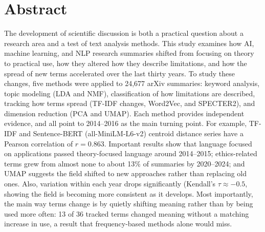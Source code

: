 \section{Abstract}
The development of scientific discussion is both a practical question about a research area and a test of text analysis methods. This study examines how AI, machine learning, and NLP research summaries shifted from focusing on theory to practical use, how they altered how they describe limitations, and how the spread of new terms accelerated over the last thirty years. To study these changes, five methods were applied to 24,677 arXiv summaries: keyword analysis, topic modeling (LDA and NMF), classification of how limitations are described, tracking how terms spread (TF-IDF changes, Word2Vec, and SPECTER2), and dimension reduction (PCA and UMAP). Each method provides independent evidence, and all point to 2014–2016 as the main turning point. For example, TF-IDF and Sentence-BERT (all-MiniLM-L6-v2) centroid distance series have a Pearson correlation of $r = 0.863$. Important results show that language focused on applications passed theory-focused language around 2014–2015; ethics-related terms grew from almost none to about 13\% of summaries by 2020–2024; and UMAP suggests the field shifted to new approaches rather than replacing old ones. Also, variation within each year drops significantly (Kendall’s $\tau \approx -0.5$, showing the field is becoming more consistent as it develops. Most importantly, the main way terms change is by quietly shifting meaning rather than by being used more often: 13 of 36 tracked terms changed meaning without a matching increase in use, a result that frequency-based methods alone would miss.